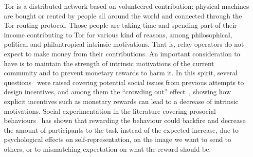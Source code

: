 

Tor is a distributed network based on volunteered contribution: physical
machines are bought or rented by people all around the world and connected
through the Tor routing protocol. Those people are taking time and spending part
of their income contributing to Tor for various kind of reasons, among
philosophical, political and philantropical intrinsic motivations. That is,
relay operators do not expect to make money from their contributions. An
important consideration to have is to maintain the strength of intrinsic
motivations of the current community and to prevent monetary rewards to harm it.
In this spirit, several questions~\cite{jansenblogpost} were raised covering
potential social issues from previous attempts to design incentives, and among
them the ``crowding out'' effect~\cite{10.1257/jep.25.4.191}, showing how
explicit incentives such as monetary rewards can lead to a decrease of intrinsic
motivations. Social experimentation in the literature covering prosocial
behaviours~\cite{10.1257/aer.96.5.1652} has shown that rewarding the behaviour
could backfire and decrease the amount of participants to the task instead of
the expected increase, due to psychological effects on self-representation, on
the image we want to send to others, or to mismatching expectation on what the
reward should be.

